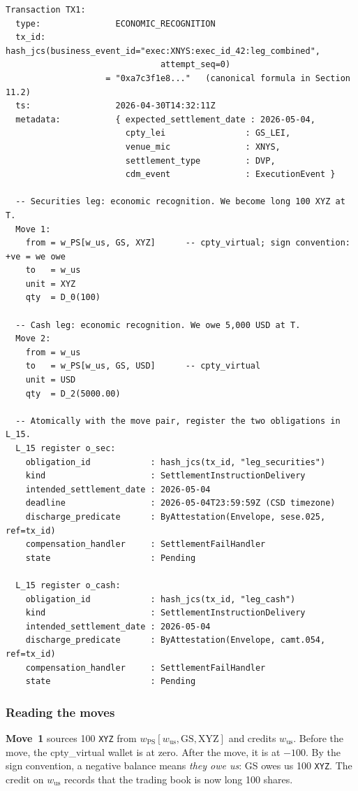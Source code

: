 \documentclass[11pt,a4paper]{article}
\begin{document}
\begin{lstlisting}
Transaction TX1:
  type:               ECONOMIC_RECOGNITION
  tx_id:              hash_jcs(business_event_id="exec:XNYS:exec_id_42:leg_combined",
                               attempt_seq=0)
                    = "0xa7c3f1e8..."   (canonical formula in Section 11.2)
  ts:                 2026-04-30T14:32:11Z
  metadata:           { expected_settlement_date : 2026-05-04,
                        cpty_lei                : GS_LEI,
                        venue_mic               : XNYS,
                        settlement_type         : DVP,
                        cdm_event               : ExecutionEvent }

  -- Securities leg: economic recognition. We become long 100 XYZ at T.
  Move 1:
    from = w_PS[w_us, GS, XYZ]      -- cpty_virtual; sign convention: +ve = we owe
    to   = w_us
    unit = XYZ
    qty  = D_0(100)

  -- Cash leg: economic recognition. We owe 5,000 USD at T.
  Move 2:
    from = w_us
    to   = w_PS[w_us, GS, USD]      -- cpty_virtual
    unit = USD
    qty  = D_2(5000.00)

  -- Atomically with the move pair, register the two obligations in L_15.
  L_15 register o_sec:
    obligation_id            : hash_jcs(tx_id, "leg_securities")
    kind                     : SettlementInstructionDelivery
    intended_settlement_date : 2026-05-04
    deadline                 : 2026-05-04T23:59:59Z (CSD timezone)
    discharge_predicate      : ByAttestation(Envelope, sese.025, ref=tx_id)
    compensation_handler     : SettlementFailHandler
    state                    : Pending

  L_15 register o_cash:
    obligation_id            : hash_jcs(tx_id, "leg_cash")
    kind                     : SettlementInstructionDelivery
    intended_settlement_date : 2026-05-04
    discharge_predicate      : ByAttestation(Envelope, camt.054, ref=tx_id)
    compensation_handler     : SettlementFailHandler
    state                    : Pending
\end{lstlisting}

\subsubsection*{Reading the moves}

\textbf{Move~1} sources 100 \texttt{XYZ} from $w_{\mathrm{PS}}[w_{\mathrm{us}}, \mathrm{GS}, \mathrm{XYZ}]$ and credits $w_{\mathrm{us}}$. Before the move, the cpty\_virtual wallet is at zero. After the move, it is at $-100$. By the sign convention, a negative balance means \emph{they owe us}: GS owes us 100 \texttt{XYZ}. The credit on $w_{\mathrm{us}}$ records that the trading book is now long 100 shares.
\end{document}
